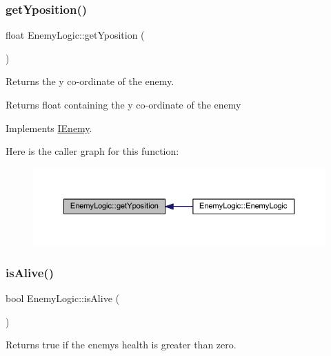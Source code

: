 \subsubsection{\texorpdfstring{get\+Yposition()}{getYposition()}}
{\footnotesize\ttfamily float Enemy\+Logic\+::get\+Yposition (\begin{DoxyParamCaption}{ }\end{DoxyParamCaption})\hspace{0.3cm}{\ttfamily [virtual]}}



Returns the y co-\/ordinate of the enemy. 

\begin{DoxyReturn}{Returns}
float containing the y co-\/ordinate of the enemy 
\end{DoxyReturn}


Implements \hyperlink{class_i_enemy_a8011be7f510f6630250f8b9529815773}{I\+Enemy}.

Here is the caller graph for this function\+:\nopagebreak
\begin{figure}[H]
\begin{center}
\leavevmode
\includegraphics[width=350pt]{class_enemy_logic_ae614032054926a4a25ed56f61111392b_icgraph}
\end{center}
\end{figure}
\mbox{\label{class_enemy_logic_a8dd48fa112c41249e46728d7ec8f820e}} 
\subsubsection{\texorpdfstring{is\+Alive()}{isAlive()}}
{\footnotesize\ttfamily bool Enemy\+Logic\+::is\+Alive (\begin{DoxyParamCaption}{ }\end{DoxyParamCaption})\hspace{0.3cm}{\ttfamily [virtual]}}



Returns true if the enemy\textquotesingle{}s health is greater than zero. 

